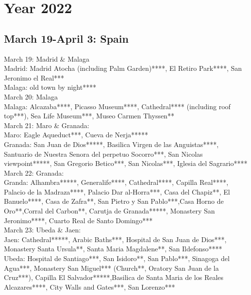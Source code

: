 \chapter{Year 2022}
\label{2022}

\section{March 19-April 3: Spain}
\label{2022:Spain}

March 19: Madrid \& Malaga\\

Madrid: Madrid Atocha (including Palm Garden)****, El Retiro Park****, San Jeronimo el Real***\\
Malaga: old town by night****\\

March 20: Malaga\\

Malaga: Alcazaba****, Picasso Museum****, Cathedral**** (including roof top***), Sea Life Museum***, Museo Carmen Thyssen**\\

March 21: Maro \& Granada:\\

Maro: Eagle Aqueduct***, Cueva de Nerja*****\\
Granada: San Juan de Dios*****, Basilica Virgen de las Anguistas****, Santuario de Nuestra Senora del perpetuo Socorro***,  San Nicolas viewpoint*****, San Gregorio Betico***, San Nicolas***, Iglesia del Sagrario****\\

March 22: Granada:\\

Granda:  Alhambra*****, Generalife****,  Cathedral****, Capilla Real****, Palacio de la Madraza****, Palacio Dar al-Horra***, Casa del Chapiz**, El Banuelo****, Casa de Zafra**, San Pietro y San Pablo***,Casa Horno de Oro**,Corral del Carbon**,
Carutja de Granada*****, Monastery San Jeronimo****, Cuarto Real de Santo Domingo***\\

March 23: Ubeda \& Jaen:\\

Jaen: Cathedral*****, Arabic Baths***, Hospital de San Juan de Dios***, Monastery Santa Ursula**, Santa Maria Magdalene**,  San Ildefonso****\\
Ubeda: Hospital de Santiago***, San Isidoro**, San Pablo***, Sinagoga del Agua***, Monastery San Miguel*** (Church**, Oratory San Juan de la Cruz***), Capilla El Salvador*****,Basilica de Santa Maria de los Reales Alcazares****, City Walls and Gates***,
San Lorenzo***\\

